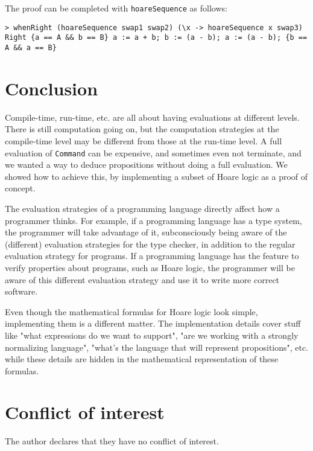 \documentclass{article}
\begin{document}
The proof can be completed with \texttt{hoareSequence} as follows:

\begin{lstlisting}
> whenRight (hoareSequence swap1 swap2) (\x -> hoareSequence x swap3)
Right {a == A && b == B} a := a + b; b := (a - b); a := (a - b); {b == A && a == B}
\end{lstlisting}

\section{Conclusion}

Compile-time, run-time, etc. are all about having evaluations at different levels. There is still computation going on, but the computation strategies at the compile-time level may be different from those at the run-time level. A full evaluation of \texttt{Command} can be expensive, and sometimes even not terminate, and we wanted a way to deduce propositions without doing a full evaluation. We showed how to achieve this, by implementing a subset of Hoare logic as a proof of concept.

The evaluation strategies of a programming language directly affect how a programmer thinks. For example, if a programming language has a type system, the programmer will take advantage of it, subconsciously being aware of the (different) evaluation strategies for the type checker, in addition to the regular evaluation strategy for programs. If a programming language has the feature to verify properties about programs, such as Hoare logic, the programmer will be aware of this different evaluation strategy and use it to write more correct software.

Even though the mathematical formulas for Hoare logic look simple, implementing them is a different matter. The implementation details cover stuff like "what expressions do we want to support", "are we working with a strongly normalizing language", "what's the language that will represent propositions", etc. while these details are hidden in the mathematical representation of these formulas.

\section{Conflict of interest}

The author declares that they have no conflict of interest.
\end{document}
